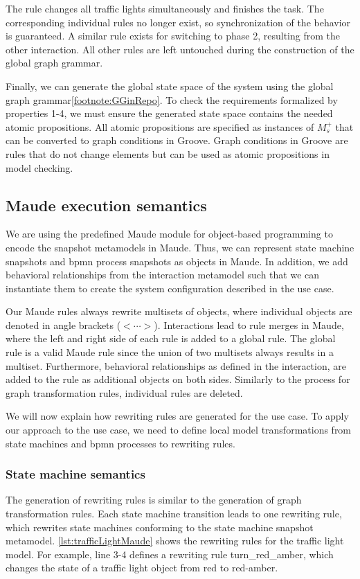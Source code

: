 \documentclass{jot}
\begin{document}
The rule changes all traffic lights simultaneously and finishes the task.
The corresponding individual rules no longer exist, so synchronization of the behavior is guaranteed.
A similar rule exists for switching to phase 2, resulting from the other interaction.
All other rules are left untouched during the construction of the global graph grammar.

Finally, we can generate the global state space of the system using the global graph grammar\cref{footnote:GGinRepo}.
To check the requirements formalized by properties 1-4, we must ensure the generated state space contains the needed atomic propositions.
All atomic propositions are specified as instances of $M_s^+$ that can be converted to graph conditions in Groove.
Graph conditions in Groove are rules that do not change elements but can be used as atomic propositions in model checking.

\subsection{Maude execution semantics}
We are using the predefined Maude module for object-based programming to encode the snapshot metamodels in Maude.
Thus, we can represent state machine snapshots and \gls*{bpmn} process snapshots as objects in Maude.
In addition, we add behavioral relationships from the interaction metamodel such that we can instantiate them to create the system configuration described in the use case.

Our Maude rules always rewrite multisets of objects, where individual objects are denoted in angle brackets ($<\cdots>$).
Interactions lead to rule merges in Maude, where the left and right side of each rule is added to a global rule.
The global rule is a valid Maude rule since the union of two multisets always results in a multiset. 
Furthermore, behavioral relationships as defined in the interaction, are added to the rule as additional objects on both sides.
Similarly to the process for graph transformation rules, individual rules are deleted.

We will now explain how rewriting rules are generated for the use case.
To apply our approach to the use case, we need to define local model transformations from state machines and \gls*{bpmn} processes to rewriting rules.

\subsubsection{State machine semantics}
The generation of rewriting rules is similar to the generation of graph transformation rules.
Each state machine transition leads to one rewriting rule, which rewrites state machines conforming to the state machine snapshot metamodel.
\autoref{lst:trafficLightMaude} shows the rewriting rules for the traffic light model.
For example, line 3-4 defines a rewriting rule \textsf{turn\_red\_amber}, which changes the state of a traffic light object from red to red-amber.
\end{document}

